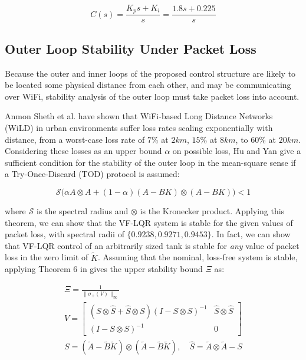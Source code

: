 \begin{equation}\label{eq:PIDTransferFunction}
	C(s) = \frac{K_ps+K_i}{s} = \frac{1.8s+0.225}{s}
\end{equation}

\subsection{Outer Loop Stability Under Packet Loss}\label{subsec:PacketLossStability}

Because the outer and inner loops of the proposed control structure are likely to be located some physical distance from each other, and may be communicating over WiFi, stability analysis of the outer loop must take packet loss into account.

Anmon Sheth et al. \cite{Sheth2007} have shown that WiFi-based Long Distance Networks (WiLD) in urban environments suffer loss rates scaling exponentially with distance, from a worst-case loss rate of $7\%$ at $2\si{km}$, $15\%$ at $8\si{km}$, to $60\%$ at $20\si{km}$. Considering these losses as an upper bound $\alpha$ on possible loss, Hu and Yan \cite{Hu2007} give a sufficient condition for the stability of the outer loop in the mean-square sense if a Try-Once-Discard (TOD) protocol is assumed:

\begin{equation}\label{eq:HuStabCondition}
	\mathcal{S}\Big(\alpha A \otimes A + (1-\alpha)(A-BK) \otimes (A-BK) \Big) < 1
\end{equation}

where $\mathcal{S}$ is the spectral radius and $\otimes$ is the Kronecker product. Applying this theorem, we can show that the VF-LQR system is stable for the given values of packet loss, with spectral radii of $\{0.9238,0.9271,0.9453\}$. In fact, we can show that VF-LQR control of an arbitrarily sized tank is stable for \textit{any} value of packet loss in the zero limit of $\tilde{K}$. Assuming that the nominal, loss-free system is stable, applying Theorem 6 in \cite{Hu2007} gives the upper stability bound $\Xi$ as: 

\begin{equation}\label{eq:VMatrix}
	\begin{gathered}
		\Xi = \frac{1}{\lVert\sigma_+(V)\rVert_\infty} \\
		V = \begin{bmatrix} (S\otimes\hat{S}+\hat{S} \otimes S)(I - S\otimes S)^{-1} & \hat{S}\otimes\hat{S} \\ (I - S\otimes S)^{-1} & 0 \end{bmatrix} \\
		S = \left(\tilde{A}-\tilde{B}\tilde{K}\right) \otimes \left(\tilde{A}-\tilde{B}\tilde{K}\right), \quad \hat{S} = \tilde{A} \otimes \tilde{A} - S
	\end{gathered}
\end{equation}

